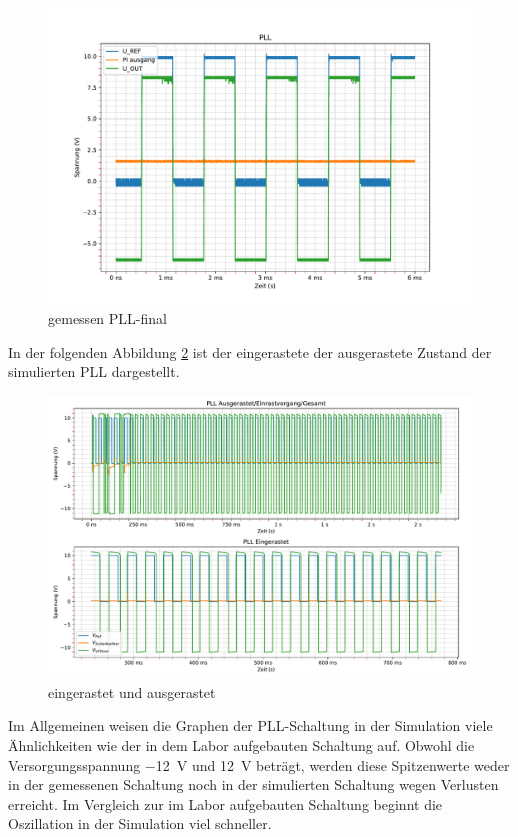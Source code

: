 \begin{figure}[H]
  \centering
  \includegraphics[width=0.8\linewidth]{Elektronik-Laborprotokoll_PLL/Plots/PLL_gemessen.pdf}
  \caption{gemessen PLL-final}
  \label{fig:PLL_alles_gemessen}
\end{figure}

In der folgenden Abbildung \ref{fig:eingerastet} ist der eingerastete der ausgerastete Zustand der simulierten PLL dargestellt.

\begin{figure}[H]
  \centering
  \includegraphics[width=0.8\linewidth]{Elektronik-Laborprotokoll_PLL/Plots/PLL-eingerastet.pdf}
  \caption{eingerastet und ausgerastet}
  \label{fig:eingerastet}
\end{figure}


Im Allgemeinen weisen die Graphen der PLL-Schaltung in der Simulation viele Ähnlichkeiten wie der in dem Labor aufgebauten Schaltung auf. Obwohl die Versorgungsspannung \SI{-12}{\volt} und \SI{12}{\volt} beträgt, werden diese Spitzenwerte weder in der gemessenen Schaltung noch in der simulierten Schaltung wegen Verlusten erreicht. Im Vergleich zur im Labor aufgebauten Schaltung beginnt die Oszillation in der Simulation viel schneller. 